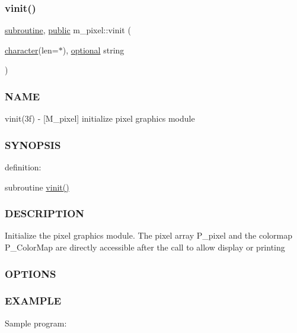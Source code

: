 \subsubsection{\texorpdfstring{vinit()}{vinit()}}
{\footnotesize\ttfamily \hyperlink{M__stopwatch_83_8txt_acfbcff50169d691ff02d4a123ed70482}{subroutine}, \hyperlink{M__stopwatch_83_8txt_a2f74811300c361e53b430611a7d1769f}{public} m\+\_\+pixel\+::vinit (\begin{DoxyParamCaption}\item[{\hyperlink{option__stopwatch_83_8txt_abd4b21fbbd175834027b5224bfe97e66}{character}(len=$\ast$), \hyperlink{option__stopwatch_83_8txt_aa4ece75e7acf58a4843f70fe18c3ade5}{optional}}]{string }\end{DoxyParamCaption})}



\subsubsection*{N\+A\+ME}

vinit(3f) -\/ \mbox{[}M\+\_\+pixel\mbox{]} initialize pixel graphics module 

\subsubsection*{S\+Y\+N\+O\+P\+S\+IS}

definition\+:

subroutine \hyperlink{namespacem__pixel_ac03ca8f23fdadb60599b6ea4dc87a6d9}{vinit()}

\subsubsection*{D\+E\+S\+C\+R\+I\+P\+T\+I\+ON}

Initialize the pixel graphics module. The pixel array P\+\_\+pixel and the colormap P\+\_\+\+Color\+Map are directly accessible after the call to allow display or printing

\subsubsection*{O\+P\+T\+I\+O\+NS}

\subsubsection*{E\+X\+A\+M\+P\+LE}

Sample program\+:

